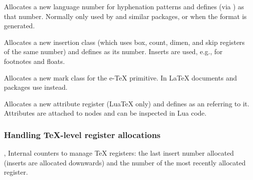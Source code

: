 \documentclass{l3in2edoc}
\begin{document}
\begin{function}[]
  {
    \newlanguage
  }
  \begin{syntax}
     
  \end{syntax}
  Allocates a new language number for hyphenation patterns and
  defines  (via ) as that number. Normally only
  used by  and similar packages, or when the format is
  generated.
\end{function}

\begin{function}[]
  {
    \newinsert
  }
  \begin{syntax}
     
  \end{syntax}
  Allocates a new insertion class (which uses box, count, dimen, and
  skip registers of the same number) and defines  as its
  number. Inserts are used, e.g., for footnotes and floats.
\end{function}

\begin{function}[]
  {
    \newmarks
  }
  \begin{syntax}
     
  \end{syntax}
  Allocates a new mark class for the e-\TeX{}  primitive.
  In \LaTeX{} documents and packages use  instead.
\end{function}



\begin{function}[]
  {
    \newattribute
  }
  \begin{syntax}
     
  \end{syntax}
  Allocates a new attribute register (Lua\TeX{} only) and defines
   as an  referring to it. Attributes
  are attached to nodes and can be inspected in Lua code.
\end{function}



\subsubsection{Handling \TeX{}-level register allocations}

\begin{function}[int]
  {
    \insc@unt,
    \allocationnumber
  }
  Internal counters to manage \TeX{} registers: the last insert
  number allocated (inserts are allocated downwards) and the number of
  the most recently allocated register.
\end{function}
\end{document}
